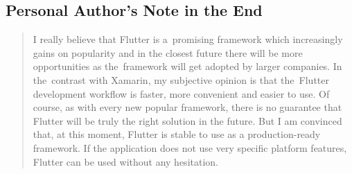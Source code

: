 \begin{conclusion}
\subsection{Personal Author's Note in the End}
\begin{quote}
I really believe that Flutter is a~promising framework which increasingly gains on popularity and in the closest future there will be more opportunities as the~framework will get adopted by larger companies. In the~contrast with Xamarin, my subjective opinion is that the~Flutter development workflow is faster, more convenient and easier to use. Of course, as with every new popular framework, there is no guarantee that Flutter will be truly the right solution in the future. But I am convinced that, at this moment, Flutter is stable to use as a production-ready framework. If the application does not use very specific platform features, Flutter can be used without any hesitation.
\end{quote}
\end{conclusion}